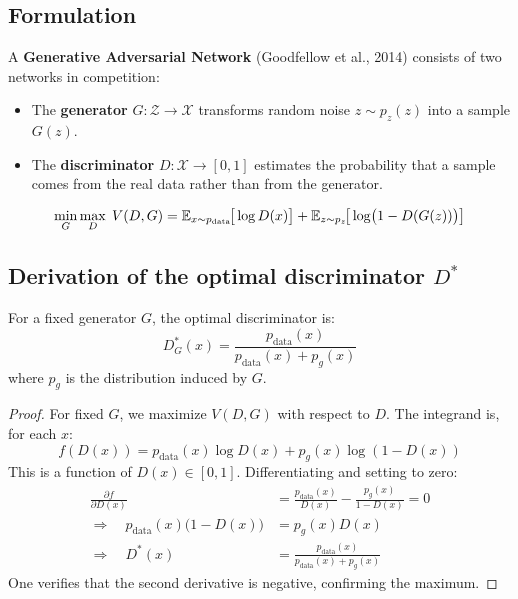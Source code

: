 \subsection{Formulation}

A \textbf{Generative Adversarial Network} (Goodfellow et al., 2014) consists of two networks in competition:
\begin{itemize}
    \item The \textbf{generator} $G : \mathcal{Z} \to \mathcal{X}$ transforms random noise $z \sim p_z(z)$ into a sample $G(z)$.
    \item The \textbf{discriminator} $D : \mathcal{X} \to [0, 1]$ estimates the probability that a sample comes from the real data rather than from the generator.
\end{itemize}

\begin{mathbox}[title=\textbf{GAN minimax objective}]
\begin{equation}
\min_G \max_D \; V(D, G) = \mathbb{E}_{x \sim p_{\text{data}}}\!\big[\log D(x)\big] + \mathbb{E}_{z \sim p_z}\!\big[\log\!\big(1 - D(G(z))\big)\big]
\label{eq:gan-minimax}
\end{equation}
\end{mathbox}

\subsection{Derivation of the optimal discriminator $D^*$}

\begin{theorem}
\label{thm:optimal-D}
For a fixed generator $G$, the optimal discriminator is:
\begin{equation}
D^*_G(x) = \frac{p_{\text{data}}(x)}{p_{\text{data}}(x) + p_g(x)}
\label{eq:optimal-D}
\end{equation}
where $p_g$ is the distribution induced by $G$.
\end{theorem}

\begin{proof}
For fixed $G$, we maximize $V(D, G)$ with respect to $D$. The integrand is, for each $x$:
\begin{equation}
f(D(x)) = p_{\text{data}}(x) \log D(x) + p_g(x) \log(1 - D(x))
\end{equation}
This is a function of $D(x) \in [0, 1]$. Differentiating and setting to zero:
\begin{align}
\frac{\partial f}{\partial D(x)} &= \frac{p_{\text{data}}(x)}{D(x)} - \frac{p_g(x)}{1 - D(x)} = 0 \\
\Rightarrow \quad p_{\text{data}}(x)\big(1 - D(x)\big) &= p_g(x) D(x) \\
\Rightarrow \quad D^*(x) &= \frac{p_{\text{data}}(x)}{p_{\text{data}}(x) + p_g(x)}
\end{align}
One verifies that the second derivative is negative, confirming the maximum.
\end{proof}

